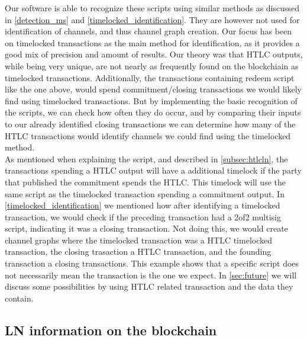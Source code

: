 Our software is able to recognize these scripts using similar methods as discussed in \cref{detection_ms} and \cref{timelocked_identification}. 
They are however not used for identification of channels, and thus channel graph creation. Our focus has been on timelocked transactions as the main method for identification, as it provides a good mix of precision and amount of results. Our theory was that HTLC outputs, while being very unique, are not nearly as frequently found on the blockchiain as timelocked transactions. Additionally, the transactions containing redeem script like the one above, would spend commitment/closing transactions we would likely find using timelocked transactions.
But by implementing the basic recognition of the scripts, we can check how often they do occur, and by comparing their inputs to our already identified closing transactions we can determine how many of the HTLC transactions would identify channels we could find using the timelocked method.
\\

As mentioned when explaining the script, and described in \cref{subsec:htlcln}, the transactions spending a HTLC output will have a additional timelock if the party that published the commitment spends the HTLC. This timelock will use the same script as the timelocked transaction spending a commitment output. In \cref{timelocked_identification} we mentioned how after identifying a timelocked transaction, we would check if the preceding transaction had a 2of2 multisig script, indicating it was a closing transaction. Not doing this, we would create channel graphs where the timelocked transaction was a HTLC timelocked transaction, the closing trasaction a HTLC transaction, and the founding transaction a closing transactions. This example shows that a specific script does not necessarily mean the transaction is the one we expect. In \cref{sec:future} we will discuss some possibilities by using HTLC related transaction and the data they contain.



\subsection{LN information on the blockchain}
\label{subsec:information_ln}

